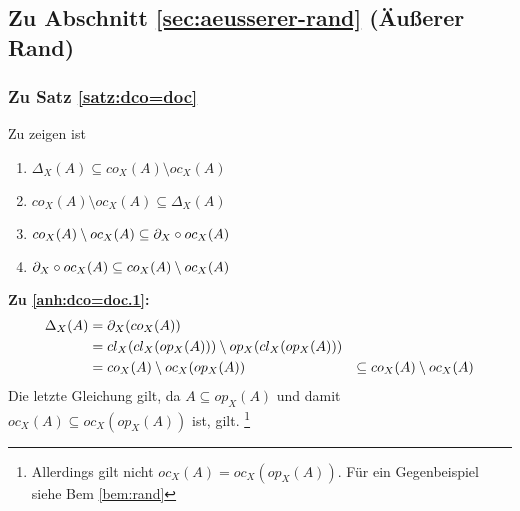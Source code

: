 \subsection{Zu Abschnitt \ref{sec:aeusserer-rand} (Äußerer Rand)}



\subsubsection{Zu Satz \ref{satz:dco=doc}} \label{anh:doc=doc} 
Zu zeigen ist
\begin{enumerate}
	\item $\Delta_X(A) \subseteq co_X(A) \setminus oc_X(A)$ \label{anh:dco=doc.1}
	\item $co_X(A) \setminus oc_X(A) \subseteq \Delta_X(A)$ \label{anh:dco=doc.2}
	\item $co_X(A) \setminus oc_X(A) \subseteq \partial_X \circ oc_X(A)$ \label{anh:dco=doc.3}
	\item $\partial_X \circ oc_X(A) \subseteq co_X(A) \setminus oc_X(A)$\label{anh:dco=doc.4}
\end{enumerate}

\noindent
\textbf{Zu \ref{anh:dco=doc.1}:}
	\begin{align*}
		\Delta_X(A) &= \partial_X(co_X(A)) &\\
		&= cl_X(cl_X(op_X(A))) \setminus op_X(cl_X(op_X(A))) \\
		&= co_X(A) \setminus oc_X(op_X(A)) &\subseteq co_X(A) \setminus oc_X(A)
	\end{align*} 
	Die letzte Gleichung gilt, da $A \subseteq op_X(A)$ und damit $oc_X(A) \subseteq oc_X(op_X(A))$ ist, gilt.
	\footnote{Allerdings gilt nicht $oc_X(A) = oc_X(op_X(A))$. Für ein Gegenbeispiel siehe Bem \ref{bem:rand} }
\\

